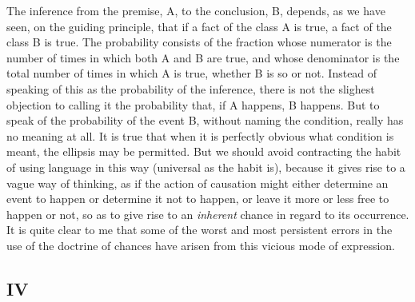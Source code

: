 The inference from the premise, A, to the conclusion, B, depends, as we have seen, on the guiding principle, that if a fact of the class A is true, a fact of the class B is true. The probability consists of the fraction whose numerator is the number of times in which both A and B are true, and whose denominator is the total number of times in which A is true, whether B is so or not. Instead of speaking of this as the probability of the inference, there is not the slighest objection to calling it the probability that, if A happens, B happens. But to speak of the probability of the event B, without naming the condition, really has no meaning at all. It is true that when it is perfectly obvious what condition is meant, the ellipsis may be permitted. But we should avoid contracting the habit of using language in this way (universal as the habit is), because it gives rise to a vague way of thinking, as if the action of causation might either determine an event to happen or determine it not to happen, or leave it more or less free to happen or not, so as to give rise to an \emph{inherent} chance in regard to its occurrence. It is quite clear to me that some of the worst and most persistent errors in the use of the doctrine of chances have arisen from this vicious mode of expression.

\subsection*{IV}


